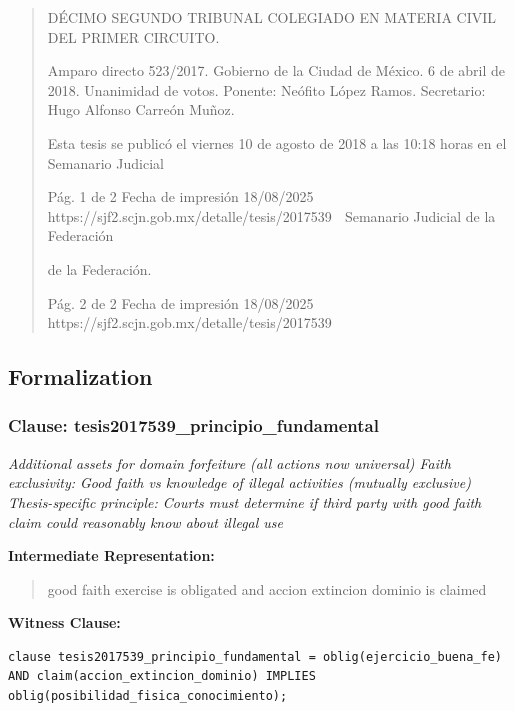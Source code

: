 \documentclass[11pt,a4paper]{article}
\begin{document}
\begin{quote}
DÉCIMO SEGUNDO TRIBUNAL COLEGIADO EN MATERIA CIVIL DEL PRIMER CIRCUITO.


Amparo directo 523/2017. Gobierno de la Ciudad de México. 6 de abril de 2018. Unanimidad de
votos. Ponente: Neófito López Ramos. Secretario: Hugo Alfonso Carreón Muñoz.


Esta tesis se publicó el viernes 10 de agosto de 2018 a las 10:18 horas en el Semanario Judicial


                                             Pág. 1 de 2           Fecha de impresión 18/08/2025
 https://sjf2.scjn.gob.mx/detalle/tesis/2017539
                                                  Semanario Judicial de la Federación

de la Federación.




                                             Pág. 2 de 2       Fecha de impresión 18/08/2025
 https://sjf2.scjn.gob.mx/detalle/tesis/2017539

\end{quote}

\subsection{Formalization}

\subsubsection{Clause: tesis2017539\_principio\_fundamental}

\textit{Additional assets for domain forfeiture (all actions now universal) Faith exclusivity: Good faith vs knowledge of illegal activities (mutually exclusive) Thesis-specific principle: Courts must determine if third party with good faith claim could reasonably know about illegal use}

\textbf{Intermediate Representation:}

\begin{quote}
good faith exercise is obligated and accion extincion dominio is claimed
\end{quote}

\textbf{Witness Clause:}

\begin{lstlisting}[style=witnessstyle, language=Witness]
clause tesis2017539_principio_fundamental = oblig(ejercicio_buena_fe) AND claim(accion_extincion_dominio) IMPLIES oblig(posibilidad_fisica_conocimiento);
\end{lstlisting}
\end{document}
